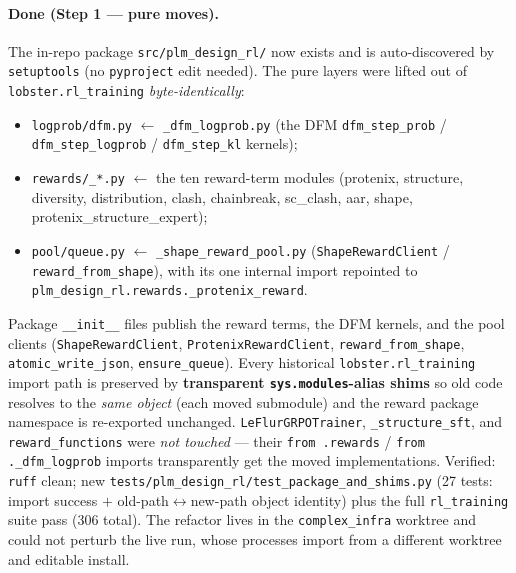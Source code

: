 \documentclass[11pt]{article}
\newcommand{\ttk}[1]{\texttt{\small #1}}
\begin{document}
\paragraph{Done (Step 1 --- pure moves).} The in-repo package \ttk{src/plm\_design\_rl/} now exists
and is auto-discovered by \ttk{setuptools} (no \ttk{pyproject} edit needed). The pure layers were
lifted out of \ttk{lobster.rl\_training} \emph{byte-identically}:
\begin{itemize}
\item \ttk{logprob/dfm.py} $\leftarrow$ \ttk{\_dfm\_logprob.py} (the DFM \ttk{dfm\_step\_prob} /
  \ttk{dfm\_step\_logprob} / \ttk{dfm\_step\_kl} kernels);
\item \ttk{rewards/\_*.py} $\leftarrow$ the ten reward-term modules (protenix, structure,
  diversity, distribution, clash, chainbreak, sc\_clash, aar, shape, protenix\_structure\_expert);
\item \ttk{pool/queue.py} $\leftarrow$ \ttk{\_shape\_reward\_pool.py} (\ttk{ShapeRewardClient} /
  \ttk{reward\_from\_shape}), with its one internal import repointed to
  \ttk{plm\_design\_rl.rewards.\_protenix\_reward}.
\end{itemize}
Package \ttk{\_\_init\_\_} files publish the reward terms, the DFM kernels, and the pool clients
(\ttk{ShapeRewardClient}, \ttk{ProtenixRewardClient}, \ttk{reward\_from\_shape},
\ttk{atomic\_write\_json}, \ttk{ensure\_queue}). Every historical
\ttk{lobster.rl\_training} import path is preserved by \textbf{transparent \ttk{sys.modules}-alias
shims} so old code resolves to the \emph{same object} (each moved submodule) and the reward package
namespace is re-exported unchanged. \ttk{LeFlurGRPOTrainer}, \ttk{\_structure\_sft}, and
\ttk{reward\_functions} were \emph{not touched} --- their \ttk{from .rewards} / \ttk{from
.\_dfm\_logprob} imports transparently get the moved implementations. Verified: \ttk{ruff} clean;
new \ttk{tests/plm\_design\_rl/test\_package\_and\_shims.py} (27 tests: import success $+$
old-path$\leftrightarrow$new-path object identity) plus the full \ttk{rl\_training} suite pass (306
total). The refactor lives in the \ttk{complex\_infra} worktree and could not perturb the live
run, whose processes import from a different worktree and editable install.
\end{document}
